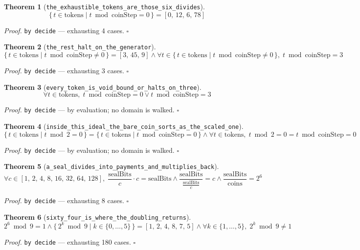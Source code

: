 \documentclass[11pt]{article}
\newtheorem{theorem}{Theorem}[section]
\begin{document}
\begin{theorem}[\texttt{the\_exhaustible\_tokens\_are\_those\_six\_divides}]
\[ \{\, t \in \mathrm{tokens} \mid t \bmod \mathrm{coinStep} = 0 \,\} = [0,\,12,\,6,\,78] \]
\end{theorem}
\noindent\emph{Proof.} \texttt{by decide} --- exhausting 4 cases. \hfill$\square$

\begin{theorem}[\texttt{the\_rest\_halt\_on\_the\_generator}]
\[ \{\, t \in \mathrm{tokens} \mid t \bmod \mathrm{coinStep} \neq 0 \,\} = [3,\,45,\,9] \land \forall t \in \{\, t \in \mathrm{tokens} \mid t \bmod \mathrm{coinStep} \neq 0 \,\},\; t \bmod \mathrm{coinStep} = 3 \]
\end{theorem}
\noindent\emph{Proof.} \texttt{by decide} --- exhausting 3 cases. \hfill$\square$

\begin{theorem}[\texttt{every\_token\_is\_void\_bound\_or\_halts\_on\_three}]
\[ \forall t \in \mathrm{tokens},\; t \bmod \mathrm{coinStep} = 0 \lor t \bmod \mathrm{coinStep} = 3 \]
\end{theorem}
\noindent\emph{Proof.} \texttt{by decide} --- by evaluation; no domain is walked. \hfill$\square$

\begin{theorem}[\texttt{inside\_this\_ideal\_the\_bare\_coin\_sorts\_as\_the\_scaled\_one}]
\[ \{\, t \in \mathrm{tokens} \mid t \bmod 2 = 0 \,\} = \{\, t \in \mathrm{tokens} \mid t \bmod \mathrm{coinStep} = 0 \,\} \land \forall t \in \mathrm{tokens},\; t \bmod 2 = 0 = t \bmod \mathrm{coinStep} = 0 \]
\end{theorem}
\noindent\emph{Proof.} \texttt{by decide} --- by evaluation; no domain is walked. \hfill$\square$

\begin{theorem}[\texttt{a\_seal\_divides\_into\_payments\_and\_multiplies\_back}]
\[ \forall c \in [1,\,2,\,4,\,8,\,16,\,32,\,64,\,128],\; \frac{\mathrm{sealBits}}{c} \cdot c = \mathrm{sealBits} \land \frac{\mathrm{sealBits}}{\frac{\mathrm{sealBits}}{c}} = c \land \frac{\mathrm{sealBits}}{\mathrm{coins}} = 2^{6} \]
\end{theorem}
\noindent\emph{Proof.} \texttt{by decide} --- exhausting 8 cases. \hfill$\square$

\begin{theorem}[\texttt{sixty\_four\_is\_where\_the\_doubling\_returns}]
\[ 2^{6} \bmod 9 = 1 \land \{\, 2^{k} \bmod 9 \mid k \in \{0,\dots,5\} \,\} = [1,\,2,\,4,\,8,\,7,\,5] \land \forall k \in \{1,\dots,5\},\; 2^{k} \bmod 9 \neq 1 \]
\end{theorem}
\noindent\emph{Proof.} \texttt{by decide} --- exhausting 180 cases. \hfill$\square$
\end{document}
